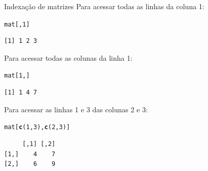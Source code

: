 \documentclass[10pt,handout]{beamer}\usepackage[]{graphicx}\usepackage[]{color}
\makeatletter
\newcommand{\hlnum}[1]{\textcolor[rgb]{0.686,0.059,0.569}{#1}}%
\newcommand{\hlstd}[1]{\textcolor[rgb]{0.345,0.345,0.345}{#1}}%
\newcommand{\hlkwd}[1]{\textcolor[rgb]{0.282,0.239,0.545}{\textbf{#1}}}%
\newenvironment{kframe}{%
 \def\at@end@of@kframe{}%
 \ifinner\ifhmode%
  \def\at@end@of@kframe{\end{minipage}}%
  \begin{minipage}{\columnwidth}%
 \fi\fi%
 \def\FrameCommand##1{\hskip\@totalleftmargin \hskip-\fboxsep
 \colorbox{shadecolor}{##1}\hskip-\fboxsep
     \hskip-\linewidth \hskip-\@totalleftmargin \hskip\columnwidth}%
 \MakeFramed {\advance\hsize-\width
   \@totalleftmargin\z@ \linewidth\hsize
   \@setminipage}}%
 {\par\unskip\endMakeFramed%
 \at@end@of@kframe}
\newenvironment{knitrout}{}{} %
\makeatother
\begin{document}
\begin{frame}[fragile]{Indexação de matrizes}
Para acessar todas as linhas da coluna 1:
\begin{knitrout}\small
{}\color{fgcolor}\begin{kframe}
\begin{alltt}
\hlstd{mat[,}\hlnum{1}\hlstd{]}
\end{alltt}
\begin{verbatim}
[1] 1 2 3
\end{verbatim}
\end{kframe}
\end{knitrout}

Para acessar todas as colunas da linha 1:
\begin{knitrout}\small
{}\color{fgcolor}\begin{kframe}
\begin{alltt}
\hlstd{mat[}\hlnum{1}\hlstd{,]}
\end{alltt}
\begin{verbatim}
[1] 1 4 7
\end{verbatim}
\end{kframe}
\end{knitrout}

Para acessar as linhas 1 e 3 das colunas 2 e 3:
\begin{knitrout}\small
{}\color{fgcolor}\begin{kframe}
\begin{alltt}
\hlstd{mat[}\hlkwd{c}\hlstd{(}\hlnum{1}\hlstd{,}\hlnum{3}\hlstd{),} \hlkwd{c}\hlstd{(}\hlnum{2}\hlstd{,}\hlnum{3}\hlstd{)]}
\end{alltt}
\begin{verbatim}
     [,1] [,2]
[1,]    4    7
[2,]    6    9
\end{verbatim}
\end{kframe}
\end{knitrout}

\end{frame}
\end{document}
